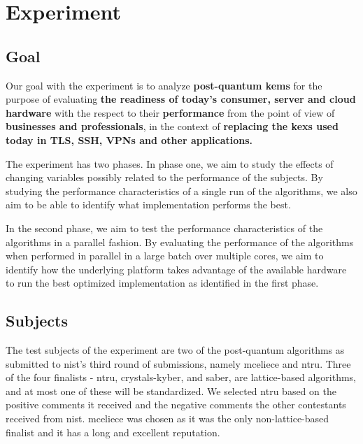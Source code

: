 \section{Experiment}
\label{section:method:experiment}

\subsection{Goal}
\label{section:method:experiment:goal}

Our goal with the experiment is to analyze \textbf{\gls{post-quantum} \glspl{kem}} for the purpose of evaluating \textbf{the readiness of today's consumer, server and cloud hardware} with the respect to their \textbf{performance} from the point of view of \textbf{businesses and professionals}, in the context of \textbf{replacing the \glspl{kex} used today in TLS, SSH, VPNs and other applications.}

The experiment has two phases. In phase one, we aim to study the effects of changing variables possibly related to the performance of the subjects. By studying the performance characteristics of a single run of the algorithms, we also aim to be able to identify what implementation performs the best.

In the second phase, we aim to test the performance characteristics of the algorithms in a parallel fashion. By evaluating the performance of the algorithms when performed in parallel in a large batch over multiple cores, we aim to identify how the underlying platform takes advantage of the available hardware to run the best optimized implementation as identified in the first phase.

\subsection{Subjects}
\label{section:method:experiment:subjects}

The test subjects of the experiment are two of the post-quantum algorithms as submitted to \gls{nist}'s third round of submissions, namely \gls{mceliece} and \gls{ntru}. Three of the four finalists - \gls{ntru}, \gls{crystals-kyber}, and \gls{saber}, are lattice-based algorithms, and at most one of these will be standardized. We selected \gls{ntru} based on the positive comments it received and the negative comments the other contestants received from \gls{nist}. \gls{mceliece} was chosen as it was the only non-lattice-based finalist and it has a long and excellent reputation\cite{nist2020}.

